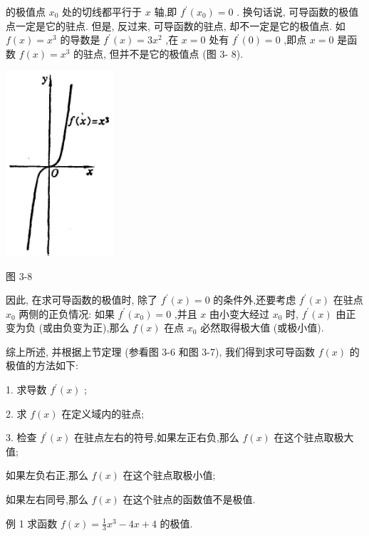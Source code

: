\documentclass[lang=cn,newtx,10pt,scheme=chinese]{elegantbook}
\begin{document}
的极值点 \({x}_{0}\) 处的切线都平行于 \(x\) 轴,即 \({f}^{\prime }\left( {x}_{0}\right) = 0\) . 换句话说, 可导函数的极值点一定是它的驻点. 但是, 反过来, 可导函数的驻点, 却不一定是它的极值点. 如 \(f\left( x\right) = {x}^{3}\) 的导数是 \({f}^{\prime }\left( x\right) = 3{x}^{2}\) ,在 \(x = 0\) 处有 \({f}^{\prime }\left( 0\right) = 0\) ,即点 \(x = 0\) 是函数 \(f\left( x\right) = {x}^{3}\) 的驻点, 但并不是它的极值点 (图 3- 8).

\begin{center}
\includegraphics[max width=0.3\textwidth]{images/01912c18-5c3f-733d-b775-749ba9897a9d_141_203287.jpg}
\end{center}

图 3-8

因此, 在求可导函数的极值时, 除了 \({f}^{\prime }\left( x\right) = 0\) 的条件外,还要考虑 \({f}^{\prime }\left( x\right)\) 在驻点 \({x}_{0}\) 两侧的正负情况: 如果 \({f}^{\prime }\left( {x}_{0}\right) = 0\) ,并且 \(x\) 由小变大经过 \({x}_{0}\) 时, \({f}^{\prime }\left( x\right)\) 由正变为负 (或由负变为正),那么 \(f\left( x\right)\) 在点 \({x}_{0}\) 必然取得极大值 (或极小值).

综上所述, 并根据上节定理 (参看图 3-6 和图 3-7), 我们得到求可导函数 \(f\left( x\right)\) 的极值的方法如下:

1. 求导数 \({f}^{\prime }\left( x\right)\) ;

2. 求 \(f\left( x\right)\) 在定义域内的驻点;

3. 检查 \({f}^{\prime }\left( x\right)\) 在驻点左右的符号,如果左正右负,那么 \(f\left( x\right)\) 在这个驻点取极大值;

如果左负右正,那么 \(f\left( x\right)\) 在这个驻点取极小值;

如果左右同号,那么 \(f\left( x\right)\) 在这个驻点的函数值不是极值.

例 1 求函数 \(f\left( x\right) = \frac{1}{3}{x}^{3} - {4x} + 4\) 的极值.
\end{document}
